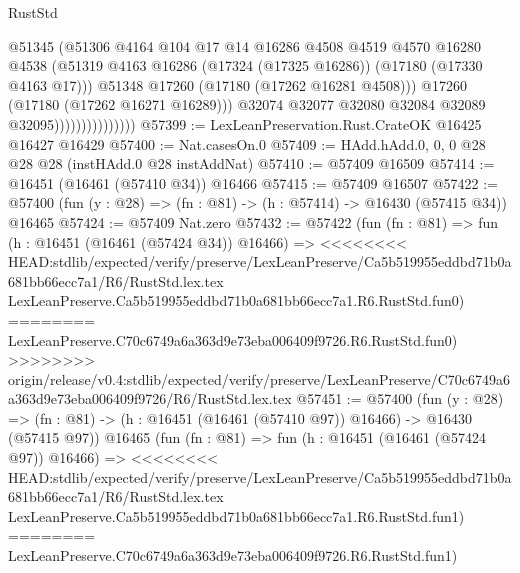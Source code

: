 \begin{lexlean}{RustStd}
\begin{coremodule}
{\begin{coremodule}
{{{{{{{{{{{{{{{{{{{{{{{{{{{{{{{{{{{{{{{{{{{{{{{{{{{{{{{                                    @51345
                                    (@51306
                                      @4164
                                      @104
                                      @17
                                      @14
                                      @16286
                                      @4508
                                      @4519
                                      @4570
                                      @16280
                                      @4538
                                      (@51319
                                        @4163
                                        @16286
                                        (@17324 (@17325 @16286))
                                        (@17180 (@17330 @4163 @17)))
                                      @51348
                                      @17260
                                      (@17180 (@17262 @16281 @4508)))
                                    @17260
                                    (@17180 (@17262 @16271 @16289)))
                                  @32074
                                  @32077
                                  @32080
                                  @32084
                                  @32089
                                  @32095)))))))))))))))
@57399 := LexLeanPreservation.Rust.CrateOK @16425 @16427 @16429
@57400 := Nat.casesOn.{0}
@57409 := HAdd.hAdd.{0, 0, 0} @28 @28 @28 (instHAdd.{0} @28 instAddNat)
@57410 := @57409 @16509
@57414 := @16451 (@16461 (@57410 @34)) @16466
@57415 := @57409 @16507
@57422 := @57400 (fun (y : @28) => (fn : @81) -> (h : @57414) -> @16430 (@57415 @34)) @16465
@57424 := @57409 Nat.zero
@57432 := @57422
    (fun (fn : @81) =>
    fun (h : @16451 (@16461 (@57424 @34)) @16466) =>
<<<<<<<< HEAD:stdlib/expected/verify/preserve/LexLeanPreserve/Ca5b519955eddbd71b0a681bb66ecc7a1/R6/RustStd.lex.tex
    LexLeanPreserve.Ca5b519955eddbd71b0a681bb66ecc7a1.R6.RustStd.fun0)
========
    LexLeanPreserve.C70c6749a6a363d9e73eba006409f9726.R6.RustStd.fun0)
>>>>>>>> origin/release/v0.4:stdlib/expected/verify/preserve/LexLeanPreserve/C70c6749a6a363d9e73eba006409f9726/R6/RustStd.lex.tex
@57451 := @57400
    (fun (y : @28) =>
    (fn : @81) -> (h : @16451 (@16461 (@57410 @97)) @16466) -> @16430 (@57415 @97))
    @16465
    (fun (fn : @81) =>
    fun (h : @16451 (@16461 (@57424 @97)) @16466) =>
<<<<<<<< HEAD:stdlib/expected/verify/preserve/LexLeanPreserve/Ca5b519955eddbd71b0a681bb66ecc7a1/R6/RustStd.lex.tex
    LexLeanPreserve.Ca5b519955eddbd71b0a681bb66ecc7a1.R6.RustStd.fun1)
========
    LexLeanPreserve.C70c6749a6a363d9e73eba006409f9726.R6.RustStd.fun1)
}}}}}}}}}}}}}}}}}}}}}}}}}}}}}}}}}}}}}}}}}}}}}}}}}}}}}}}
\end{coremodule}}
\end{coremodule}
\end{lexlean}
